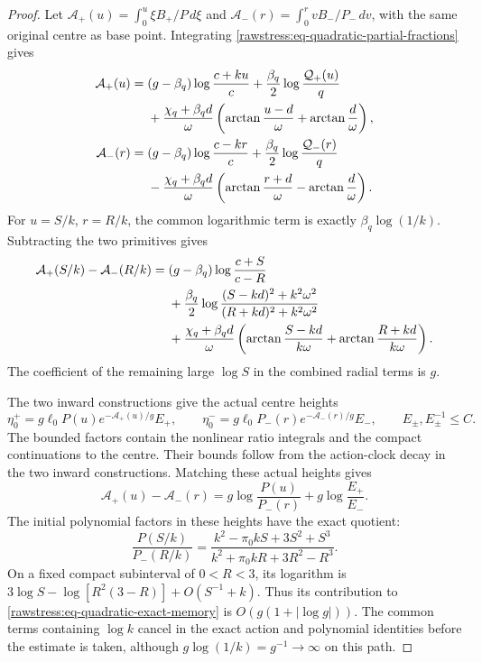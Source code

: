 \begin{proof}
Let \(\mathcal A_+(u)=\int_0^u\xi B_+/P\,d\xi\) and
\(\mathcal A_-(r)=\int_0^r vB_-/P_-\,dv\), with the same original
centre as base point. Integrating \eqref{rawstress:eq-quadratic-partial-fractions}
gives
\begin{align}
 \mathcal A_+(u)={}&(g-\beta_q)\log\frac{c+ku}{c}
       +\frac{\beta_q}{2}\log\frac{\mathcal Q_+(u)}q\notag\\
 &+\frac{\chi_q+\beta_qd}{\omega}
   \left(\arctan\frac{u-d}{\omega}+\arctan\frac d\omega\right),\notag\\
 \mathcal A_-(r)={}&(g-\beta_q)\log\frac{c-kr}{c}
       +\frac{\beta_q}{2}\log\frac{\mathcal Q_-(r)}q\notag\\
 &-\frac{\chi_q+\beta_qd}{\omega}
   \left(\arctan\frac{r+d}{\omega}-\arctan\frac d\omega\right).
 \label{rawstress:eq-quadratic-primitives}
\end{align}
For \(u=S/k\), \(r=R/k\), the common logarithmic term is exactly
\(\beta_q\log(1/k)\). Subtracting the two primitives gives
\begin{align}
 \mathcal A_+(S/k)-\mathcal A_-(R/k)={}&
  (g-\beta_q)\log\frac{c+S}{c-R}\notag\\
 &+\frac{\beta_q}{2}\log
   \frac{(S-kd)^2+k^2\omega^2}{(R+kd)^2+k^2\omega^2}\notag\\
 &+\frac{\chi_q+\beta_qd}{\omega}
  \left(\arctan\frac{S-kd}{k\omega}
             +\arctan\frac{R+kd}{k\omega}\right).
 \label{rawstress:eq-quadratic-action-difference}
\end{align}
The coefficient of the remaining large \(\log S\) in the combined
radial terms is \(g\).

The two inward constructions give the actual centre heights
\[
 \eta_0^+=g\ell_0P(u)e^{-\mathcal A_+(u)/g}E_+,\qquad
 \eta_0^-=g\ell_0P_-(r)e^{-\mathcal A_-(r)/g}E_-,
 \qquad E_\pm,E_\pm^{-1}\le C.
\]
The bounded factors contain the nonlinear ratio integrals and the
compact continuations to the centre. Their bounds follow from the action-clock decay
in the two inward constructions. Matching these actual heights gives
\begin{equation}\label{rawstress:eq-quadratic-exact-memory}
 \mathcal A_+(u)-\mathcal A_-(r)
    =g\log\frac{P(u)}{P_-(r)}+g\log\frac{E_+}{E_-}.
\end{equation}
The initial polynomial factors in these heights have the exact quotient:
\begin{equation}\label{rawstress:eq-quadratic-polynomial-memory}
 \frac{P(S/k)}{P_-(R/k)}
   =\frac{k^2-\pi_0kS+3S^2+S^3}
          {k^2+\pi_0kR+3R^2-R^3}.
\end{equation}
On a fixed compact subinterval of \(0<R<3\), its logarithm is
\(3\log S-\log[R^2(3-R)]+O(S^{-1}+k)\).
Thus its contribution to \eqref{rawstress:eq-quadratic-exact-memory}
is \(O(g(1+|\log g|))\). The common terms containing \(\log k\) cancel in the exact action and
polynomial identities before the estimate is taken, although
\(g\log(1/k)=g^{-1}\to\infty\) on this path.


\end{proof}
